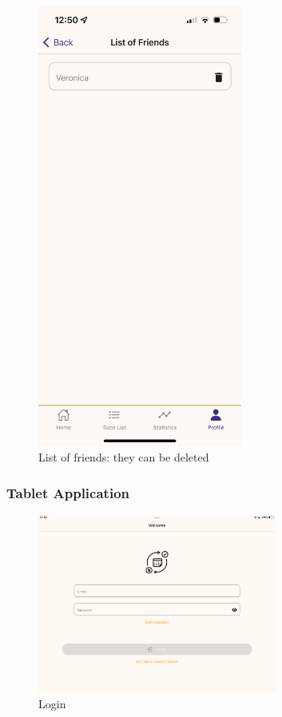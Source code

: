 \documentclass[11pt]{article}
\begin{document}
\begin{figure}[h!]
\begin{minipage}[c]{0.45\textwidth}
        \includegraphics[width=0.6\textwidth, clip]{../../assets/smartphone/listFriends.PNG}
        \caption{List of friends: they can be deleted}
        \label{fig:listFriends}
    \end{minipage}
\end{figure}

\clearpage
\subsubsection{Tablet Application}
\begin{figure}[h!]
    \begin{center}
        \includegraphics[width=0.7\textwidth, clip]{../../assets/tablet/login.png}
    \end{center}
    \caption{Login}
    \label{fig:tlogin}
\end{figure}
\end{document}
